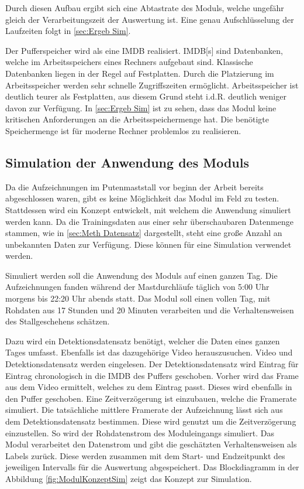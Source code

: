 Durch diesen Aufbau ergibt sich eine Abtastrate des Moduls, welche ungefähr gleich der Verarbeitungszeit der Auswertung ist. Eine genau Aufschlüsselung der Laufzeiten folgt in \ref{sec:Ergeb Sim}. \par

Der Pufferspeicher wird als eine \gls{IMDB} realisiert. \gls{IMDB}[s] sind Datenbanken, welche im Arbeitsspeichers eines Rechners aufgebaut sind. Klassische Datenbanken liegen in der Regel auf Festplatten. Durch die Platzierung im Arbeitsspeicher werden sehr schnelle Zugriffszeiten ermöglicht. Arbeitsspeicher ist deutlich teurer als Festplatten, aus diesem Grund steht i.d.R. deutlich weniger davon zur Verfügung. In \ref{sec:Ergeb Sim} ist zu sehen, dass das Modul keine kritischen Anforderungen an die Arbeitsspeichermenge hat. Die benötigte Speichermenge ist für moderne Rechner problemlos zu realisieren. \par


\subsection{Simulation der Anwendung des Moduls} \label{sec:Meth Sim}
Da die Aufzeichnungen im Putenmaststall vor beginn der Arbeit bereits abgeschlossen waren, gibt es keine Möglichkeit das Modul im Feld zu testen. Stattdessen wird ein Konzept entwickelt, mit welchem die Anwendung simuliert werden kann. Da die Trainingsdaten aus einer sehr überschaubaren Datenmenge stammen, wie in \ref{sec:Meth Datensatz} dargestellt, steht eine große Anzahl an unbekannten Daten zur Verfügung. Diese können für eine Simulation verwendet werden. \par

Simuliert werden soll die Anwendung des Moduls auf einen ganzen Tag. Die Aufzeichnungen fanden während der Mastdurchläufe täglich von 5:00 Uhr morgens bis 22:20 Uhr abends statt. Das Modul soll einen vollen Tag, mit Rohdaten aus 17 Stunden und 20 Minuten verarbeiten und die Verhaltensweisen des Stallgeschehens schätzen.\par

Dazu wird ein Detektionsdatensatz benötigt, welcher die Daten eines ganzen Tages umfasst. Ebenfalls ist das dazugehörige Video herauszusuchen. Video und Detektionsdatensatz werden eingelesen. Der Detektionsdatensatz wird Eintrag für Eintrag chronologisch in die \gls{IMDB} des Puffers geschoben. Vorher wird das Frame aus dem Video ermittelt, welches zu dem Eintrag passt. Dieses wird ebenfalls in den Puffer geschoben. Eine Zeitverzögerung ist einzubauen, welche die Framerate simuliert. Die tatsächliche mittlere Framerate der Aufzeichnung lässt sich aus dem Detektionsdatensatz bestimmen. Diese wird genutzt um die Zeitverzögerung einzustellen. So wird der Rohdatenstrom des Moduleingangs simuliert. Das Modul verarbeitet den Datenstrom und gibt die geschätzten Verhaltensweisen als Labels zurück. Diese werden zusammen mit dem Start- und Endzeitpunkt des jeweiligen Intervalls für die Auswertung abgespeichert. Das Blockdiagramm in der Abbildung \ref{fig:ModulKonzeptSim} zeigt das Konzept zur Simulation. 

